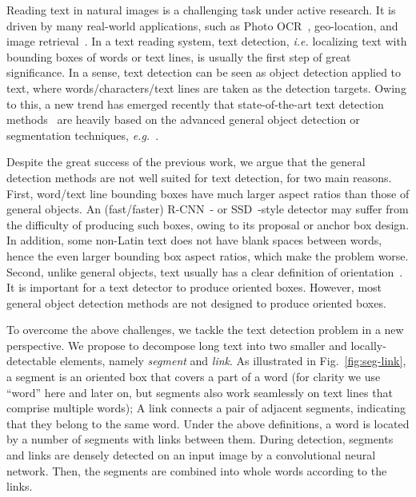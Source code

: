 \documentclass[10pt,twocolumn,letterpaper]{article}
\begin{document}
Reading text in natural images is a challenging task under active research. It is driven by many real-world applications, such as Photo OCR~\cite{iccv/BissaccoCNN13}, geo-location, and image retrieval~\cite{ijcv/JaderbergSVZ16}.
In a text reading system, text detection, \emph{i.e.} localizing text with bounding boxes of words or text lines, is usually the first step of great significance.
In a sense, text detection can be seen as object detection applied to text, where words/characters/text lines are taken as the detection targets.
Owing to this, a new trend has emerged recently that state-of-the-art text detection methods~\cite{ijcv/JaderbergSVZ16, cvpr/GuptaVZ16, eccv/TianHHH016, cvpr/ZhangZSYLB16} are heavily based on the advanced general object detection or segmentation techniques, \emph{e.g.}~\cite{iccv/Girshick15, cvpr/GirshickDDM14, cvpr/LongSD15}.

Despite the great success of the previous work, we argue that the general detection methods are not well suited for text detection, for two main reasons.
First, word/text line bounding boxes have much larger aspect ratios than those of general objects. An (fast/faster) R-CNN~\cite{cvpr/GirshickDDM14,iccv/Girshick15,nips/RenHGS15}- or SSD~\cite{eccv/LiuAESRFB16}-style detector may suffer from the difficulty of producing such boxes, owing to its proposal or anchor box design.
In addition, some non-Latin text does not have blank spaces between words, hence the even larger bounding box aspect ratios, which make the problem worse.
Second, unlike general objects, text usually has a clear definition of orientation~\cite{cvpr/YaoBLMT12}.
It is important for a text detector to produce oriented boxes.
However, most general object detection methods are not designed to produce oriented boxes.

To overcome the above challenges, we tackle the text detection problem in a new perspective. We propose to decompose long text into two smaller and locally-detectable elements, namely \emph{segment} and \emph{link}.
As illustrated in Fig.~\ref{fig:seg-link}, a segment is an oriented box that covers a part of a word (for clarity we use ``word'' here and later on, but segments also work seamlessly on text lines that comprise multiple words); A link connects a pair of adjacent segments, indicating that they belong to the same word. Under the above definitions, a word is located by a number of segments with links between them.
During detection, segments and links are densely detected on an input image by a convolutional neural network. Then, the segments are combined into whole words according to the links.
\end{document}
